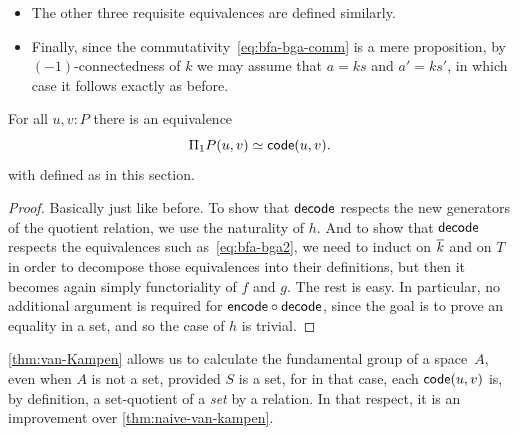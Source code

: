 \begin{itemize}
\begin{align*}
    (\dots, y_n, p_n,fks) &\mapsto (\dots,y_n,p_n,s,\refl{gks},gks),\\
    (\dots, x_n, p_n, s, \refl{fks}, fks) &\mapsfrom (\dots, x_n, p_n, gks).
  \end{align*}
  These respect the equivalence relations, and define quasi-inverses just as before.
  Now suppose $t$ varies along $m_{s,s'}(w)$ for some $w:ks=ks'$; we must show that~\eqref{eq:bfa-bga2} respects transporting along $\kbar mw$.
  By definition of $\kbar$, this essentially boils down to transporting along $w$ itself.
  By the characterization of transport in path types, what we need to show is that
  \[ w_*(\dots, y_n, p_n,fks) = (\dots,y_n, p_n \ct fw, fks') \]
  is mapped by~\eqref{eq:bfa-bga2} to
  \[ w_*(\dots,y_n,p_n,s,\refl{gks},gks) = (\dots, y_n, p_n, s, \refl{gks} \ct gw, gks') \]
  But this follows directly from the new generators we have imposed on the set-quotient relation defining \code.
\item The other three requisite equivalences are defined similarly.
\item Finally, since the commutativity~\eqref{eq:bfa-bga-comm} is a mere proposition, by $(-1)$-connectedness of $k$ we may assume that $a=ks$ and $a'=ks'$, in which case it follows exactly as before.
\end{itemize}

\begin{thm}\label{thm:van-Kampen}
  For all $u,v:P$ there is an equivalence
  \[ \Pi_1P(u,v) \simeq \mathsf{code}(u,v). \]
  with \code defined as in this section.
\end{thm}

\begin{proof}
  Basically just like before.
  To show that $\mathsf{decode}$ respects the new generators of the quotient relation, we use the naturality of $h$.
  And to show that $\mathsf{decode}$ respects the equivalences such as~\eqref{eq:bfa-bga2}, we need to induct on $\kbar$ and on $T$ in order to decompose those equivalences into their definitions, but then it becomes again simply functoriality of $f$ and $g$.
  The rest is easy.
  In particular, no additional argument is required for $\mathsf{encode}\circ\mathsf{decode}$, since the goal is to prove an equality in a set, and so the case of $h$ is trivial.
\end{proof}

%

%
\cref{thm:van-Kampen} allows us to calculate the fundamental group of a space~$A$,
even when $A$ is not a set, provided $S$ is a set, for in that case,
each $\mathsf{code}(u,v)$ is, by definition, a set-quotient of a \emph{set} by a
relation.  In that respect, it is an improvement over
\cref{thm:naive-van-kampen}.

